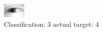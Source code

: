 \begin{figure}[h!]
\begin{center}
\includegraphics[width=0.60\columnwidth]{figures/ID2463_class_3_target_4.png}
\end{center}
\caption{ Classification: 3 actual target: 4}
\label{fig:ID2463_class_3_target_4}
\end{figure}
